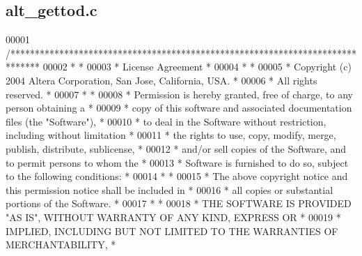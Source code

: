 \subsection{alt\+\_\+gettod.\+c}
\label{alt__gettod_8c_source}

\begin{DoxyCode}
00001 \textcolor{comment}{/******************************************************************************}
00002 \textcolor{comment}{*                                                                             *}
00003 \textcolor{comment}{* License Agreement                                                           *}
00004 \textcolor{comment}{*                                                                             *}
00005 \textcolor{comment}{* Copyright (c) 2004 Altera Corporation, San Jose, California, USA.           *}
00006 \textcolor{comment}{* All rights reserved.                                                        *}
00007 \textcolor{comment}{*                                                                             *}
00008 \textcolor{comment}{* Permission is hereby granted, free of charge, to any person obtaining a     *}
00009 \textcolor{comment}{* copy of this software and associated documentation files (the "Software"),  *}
00010 \textcolor{comment}{* to deal in the Software without restriction, including without limitation   *}
00011 \textcolor{comment}{* the rights to use, copy, modify, merge, publish, distribute, sublicense,    *}
00012 \textcolor{comment}{* and/or sell copies of the Software, and to permit persons to whom the       *}
00013 \textcolor{comment}{* Software is furnished to do so, subject to the following conditions:        *}
00014 \textcolor{comment}{*                                                                             *}
00015 \textcolor{comment}{* The above copyright notice and this permission notice shall be included in  *}
00016 \textcolor{comment}{* all copies or substantial portions of the Software.                         *}
00017 \textcolor{comment}{*                                                                             *}
00018 \textcolor{comment}{* THE SOFTWARE IS PROVIDED "AS IS", WITHOUT WARRANTY OF ANY KIND, EXPRESS OR  *}
00019 \textcolor{comment}{* IMPLIED, INCLUDING BUT NOT LIMITED TO THE WARRANTIES OF MERCHANTABILITY,    *}

\end{DoxyCode}
